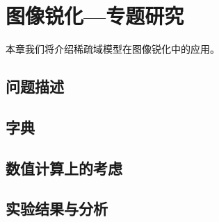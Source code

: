 \chapter{图像锐化—专题研究}\label{chap:sra:sharpen}


本章我们将介绍稀疏域模型在图像锐化中的应用。


\section{问题描述}


\section{字典}

\section{数值计算上的考虑}


\section{实验结果与分析}